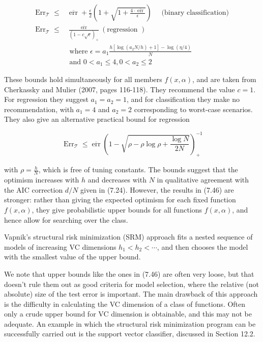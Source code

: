 \documentclass[10pt]{article}
\begin{document}
\begin{align*}
\operatorname{Err}_{\mathcal{T}} \leq & \overline{\operatorname{err}}+\frac{\epsilon}{2}\left(1+\sqrt{1+\frac{4 \cdot \overline{\operatorname{err}}}{\epsilon}}\right) \quad \text { (binary classification) } \\
\operatorname{Err}_{\mathcal{T}} \leq & \frac{\overline{\operatorname{err}}}{(1-c \sqrt{\epsilon})_{+}}(\text {regression })  \tag{7.46}\\
& \text { where } \epsilon=a_{1} \frac{h\left[\log \left(a_{2} N / h\right)+1\right]-\log (\eta / 4)}{N} \\
& \text { and } 0<a_{1} \leq 4,0<a_{2} \leq 2
\end{align*}


These bounds hold simultaneously for all members $f(x, \alpha)$, and are taken from Cherkassky and Mulier (2007, pages 116-118). They recommend the value $c=1$. For regression they suggest $a_{1}=a_{2}=1$, and for classification they make no recommendation, with $a_{1}=4$ and $a_{2}=2$ corresponding to worst-case scenarios. They also give an alternative practical bound for regression


\begin{equation*}
\operatorname{Err}_{\mathcal{T}} \leq \overline{\operatorname{err}}\left(1-\sqrt{\rho-\rho \log \rho+\frac{\log N}{2 N}}\right)_{+}^{-1} \tag{7.47}
\end{equation*}


with $\rho=\frac{h}{N}$, which is free of tuning constants. The bounds suggest that the optimism increases with $h$ and decreases with $N$ in qualitative agreement with the AIC correction $d / N$ given in (7.24). However, the results in (7.46) are stronger: rather than giving the expected optimism for each fixed function $f(x, \alpha)$, they give probabilistic upper bounds for all functions $f(x, \alpha)$, and hence allow for searching over the class.

Vapnik's structural risk minimization (SRM) approach fits a nested sequence of models of increasing VC dimensions $h_{1}<h_{2}<\cdots$, and then chooses the model with the smallest value of the upper bound.

We note that upper bounds like the ones in (7.46) are often very loose, but that doesn't rule them out as good criteria for model selection, where the relative (not absolute) size of the test error is important. The main drawback of this approach is the difficulty in calculating the VC dimension of a class of functions. Often only a crude upper bound for VC dimension is obtainable, and this may not be adequate. An example in which the structural risk minimization program can be successfully carried out is the support vector classifier, discussed in Section 12.2.
\end{document}
